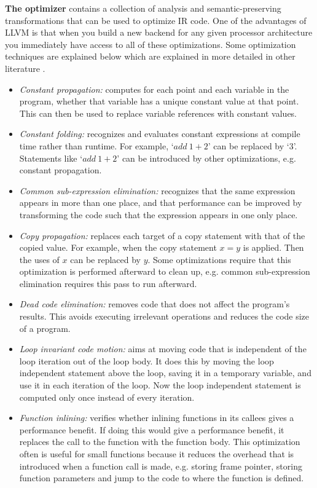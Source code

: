 \textbf{The optimizer} contains a collection of analysis and semantic-preserving transformations that can be used to optimize IR code. One of the advantages of LLVM is that when you build a new backend for any given processor architecture you immediately have access to all of these optimizations. Some optimization techniques are explained below which are explained in more detailed in other literature \cite[Chapter~9]{dragon_book}.%
\begin{itemize}
\item \emph{Constant propagation:} computes for each point and each variable in the program, whether that variable has a unique constant value at that point. This can then be used to replace variable references with constant values.
\item \emph{Constant folding:} recognizes and evaluates constant expressions at compile time rather than runtime. For example, `$add\ 1+2$' can be replaced by `$3$'. Statements like `$add\ 1+2$' can be introduced by other optimizations, e.g. constant propagation. 
\item \emph{Common sub-expression elimination:} recognizes that the same expression appears in more than one place, and that performance can be improved by transforming the code such that the expression appears in one only place.
\item \emph{Copy propagation:} replaces each target of a copy statement with that of the copied value. For example, when the copy statement $x = y$ is applied. Then the uses of $x$ can be replaced by $y$. Some optimizations require that this optimization is performed afterward to clean up, e.g. common sub-expression elimination requires this pass to run afterward. 
\item \emph{Dead code elimination:} removes code that does not affect the program's results. This avoids executing irrelevant operations and reduces the code size of a program.  
\item \emph{Loop invariant code motion:} aims at moving code that is independent of the loop iteration out of the loop body. It does this by moving the loop independent statement above the loop, saving it in a temporary variable, and use it in each iteration of the loop. Now the loop independent statement is computed only once instead of every iteration. 
\item \emph{Function inlining:} verifies whether inlining functions in its callees gives a performance benefit. If doing this would give a performance benefit, it replaces the call to the function with the function body. This optimization often is useful for small functions because it reduces the overhead that is introduced when a function call is made, e.g. storing frame pointer, storing function parameters and jump to the code to where the function is defined.     
\end{itemize}

